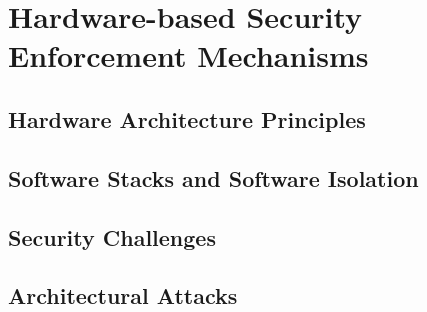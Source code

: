 \chapter{Hardware-based Security Enforcement Mechanisms}

\section{Hardware Architecture Principles}

\section{Software Stacks and Software Isolation}

\section{Security Challenges}

\section{Architectural Attacks}
